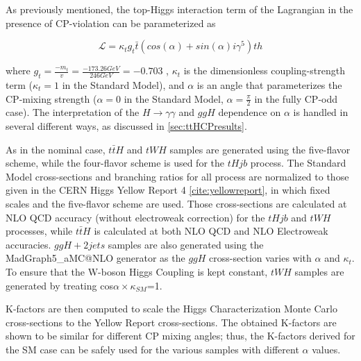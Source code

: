 As previously mentioned, the top-Higgs interaction term of the Lagrangian in the presence of CP-violation can be parameterized as

\begin{equation}
\mathcal{L} = \kappa_{t} g_{t} \bar{t} (cos(\alpha)+ sin(\alpha) i \gamma^{5} )th
\end{equation}

where $g_{t} = \frac{-m_{t}}{v} = \frac{-173.26 GeV}{246 GeV} = -0.703$ , $\kappa_{t}$ is the dimensionless coupling-strength term ($\kappa_{t}= 1$ in the Standard Model), and $\alpha$ is an angle that parameterizes the CP-mixing strength ($\alpha = 0$ in the Standard Model, $\alpha = \frac{\pi}{2}$ in the fully CP-odd case). The interpretation of the $H \rightarrow \gamma \gamma$ and $ggH$ dependence on $\alpha$ is handled in several different ways, as discussed in \ref{sec:ttHCPresults}.

As in the nominal case, $t\bar{t}H$ and $tWH$ samples are generated using the five-flavor scheme, while the four-flavor scheme is used for the $tHjb$ process. The Standard Model cross-sections and branching ratios for all process are normalized to those given in the CERN Higgs Yellow Report 4 \ref{cite:yellowreport}, in which fixed scales and the five-flavor scheme are used. Those cross-sections are calculated at NLO QCD accuracy (without electroweak correction) for the $tHjb$ and $tWH$ processes, while $t\bar{t}H$ is calculated at both NLO QCD and NLO Electroweak accuracies. $ggH+ 2 jets$ samples are also generated using the MadGraph5\_aMC@NLO generator as the $ggH$ cross-section varies with $\alpha$ and $\kappa_{t}$. To ensure that the W-boson Higgs Coupling is kept constant, $tWH$ samples are generated by treating cos$\alpha \times \kappa_{SM}$=1.


K-factors are then computed to scale the Higgs Characterization Monte Carlo cross-sections to the Yellow Report cross-sections. The obtained K-factors are shown to be similar for different CP mixing angles; thus, the K-factors derived for the SM case can be safely used for the various samples with different $\alpha$ values. 

